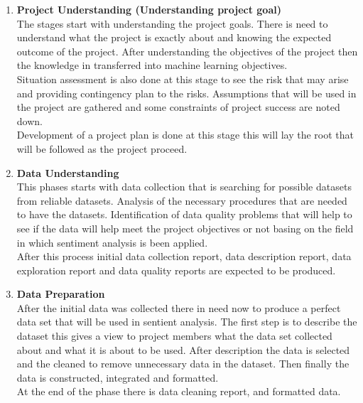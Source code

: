 \documentclass[12pt]{report}
\begin{document}
	\begin{enumerate}
		\item \textbf{Project Understanding (Understanding project goal)}\\
		The stages start with understanding the project goals. There is need to understand what the project is exactly about and knowing the expected outcome of the project. After understanding the objectives of the project then the knowledge in transferred into machine learning objectives.\\
		
		Situation assessment is also done at this stage to see the risk that may arise and providing contingency plan to the risks. Assumptions that will be used in the project are gathered and some constraints of project success are noted down.\\
		
		Development of a project plan is done at this stage this will lay the root that will be followed as the project proceed.\\
		
		\item \textbf{Data Understanding}\\
		This phases starts with data collection that is searching for possible datasets from reliable datasets. Analysis of the necessary procedures that are needed to have the datasets. Identification of data quality problems that will help to see if the data will help meet the project objectives or not basing on the field in which sentiment analysis is been applied.\\
		
		After this process initial data collection report, data description report, data exploration report and data quality reports are expected to be produced.\\
		
		\item \textbf{Data Preparation}\\
		After the initial data was collected there in need now to produce a perfect data set that will be used in sentient analysis. The first step is to describe the dataset this gives a view to project members what the data set collected about and what it is about to be used. After description the data is selected and the cleaned to remove unnecessary data in the dataset. Then finally the data is constructed, integrated and formatted.\\
		
		At the end of the phase there is data cleaning report, and formatted data.\\
		

\end{enumerate}
\end{document}
